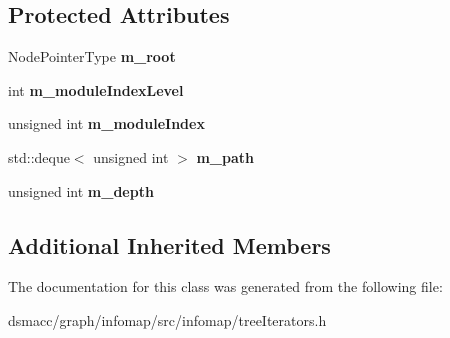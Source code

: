 \subsection*{Protected Attributes}
\begin{DoxyCompactItemize}
\item 
\mbox{\label{classInfomapIteratorBase_a23a61e7c7972eb8734acff2f8bea461f}} 
Node\+Pointer\+Type {\bfseries m\+\_\+root}
\item 
\mbox{\label{classInfomapIteratorBase_a3ade7c6551af661dab8614bdb494c965}} 
int {\bfseries m\+\_\+module\+Index\+Level}
\item 
\mbox{\label{classInfomapIteratorBase_a07629d630a2cfbe7d0e9f9b83d2a3e1f}} 
unsigned int {\bfseries m\+\_\+module\+Index}
\item 
\mbox{\label{classInfomapIteratorBase_a425fd4f3c5cc39415d2d562c98b29fcc}} 
std\+::deque$<$ unsigned int $>$ {\bfseries m\+\_\+path}
\item 
\mbox{\label{classInfomapIteratorBase_a62d99a01bb580fda03abe16eee3c8b7f}} 
unsigned int {\bfseries m\+\_\+depth}
\end{DoxyCompactItemize}
\subsection*{Additional Inherited Members}


The documentation for this class was generated from the following file\+:\begin{DoxyCompactItemize}
\item 
dsmacc/graph/infomap/src/infomap/tree\+Iterators.\+h\end{DoxyCompactItemize}
